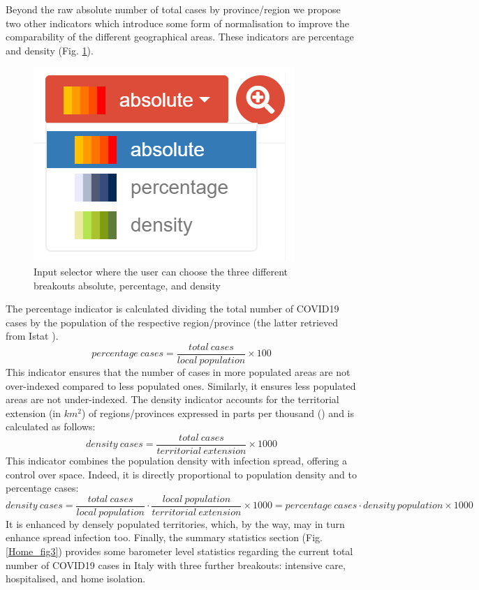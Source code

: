 \documentclass[
12pt, %
a4paper, %
oneside, %
headinclude,footinclude, %
BCOR5mm, %
]{scrartcl}
\begin{document}
Beyond the raw absolute number of total cases by province/region we propose two other indicators which introduce some form of normalisation to improve the comparability of the different geographical areas. These indicators are percentage and density (Fig. \ref{Home_fig2}).

\begin{figure}[h]
 \centering
 \includegraphics[width=0.5\linewidth]{Figures/Home_figure_2.png} 
 \caption{Input selector where the user can choose the three different breakouts absolute, percentage, and density}
 \label{Home_fig2}
\end{figure}

The percentage indicator is calculated dividing the total number of COVID19 cases by the population of the respective region/province (the latter retrieved from Istat \cite{Istat+res0,Istat+res1}).
\begin{equation}
percentage~cases = \frac{total~cases}{local~population} \times 100
\end{equation}
This indicator ensures that the number of cases in more populated areas are not over-indexed compared to less populated ones. Similarly, it ensures less populated areas are not under-indexed. 
The density indicator accounts for the territorial extension (in $km^2$) of regions/provinces expressed in parts per thousand (\textperthousand ) and is calculated as follows:
\begin{equation}
density~cases =  \dfrac{total~cases}{territorial~extension}\times 1000
\end{equation}
This indicator combines the population density with infection spread, offering a control over space. Indeed, it is directly proportional to population density and to percentage cases:
\begin{equation}
density~cases =  \dfrac{total~cases}{local~population} \cdot \dfrac{local~population}{territorial~extension} \times 1000 = percentage~cases \cdot density~population \times 1000
\end{equation}
It is enhanced by densely populated territories, which, by the way, may in turn enhance spread infection too.
Finally, the summary statistics section (Fig. \ref{Home_fig3}) provides some barometer level statistics regarding the current total number of COVID19 cases in Italy with three further breakouts: intensive care, hospitalised, and home isolation.
\end{document}
